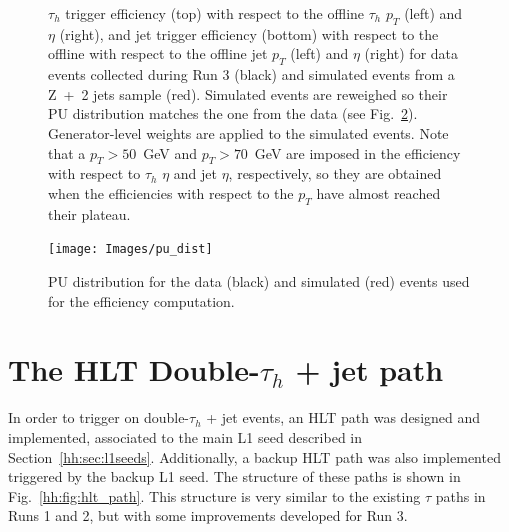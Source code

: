 \documentclass[../main.tex]{subfiles}
\begin{document}
\begin{figure}[h!]
\begin{center}
\end{center}
\caption{$\tau_h$ trigger efficiency (top) with respect to the offline $\tau_h$ $p_T$ (left) and $\eta$ (right), and jet trigger efficiency (bottom) with respect to the offline with respect to the offline jet $p_T$ (left) and $\eta$ (right) for data events collected during Run 3 (black) and simulated events from a Z~+~2 jets sample (red). Simulated events are reweighed so their PU distribution matches the one from the data (see Fig.~\ref{hh:fig:trig_pu_dist}). Generator-level weights are applied to the simulated events. Note that a $p_T>50$~GeV and $p_T>70$~GeV are imposed in the efficiency with respect to $\tau_h$ $\eta$ and jet $\eta$, respectively, so they are obtained when the efficiencies with respect to the $p_T$ have almost reached their plateau. }
\label{hh:fig:l1_eff_datamc}
\end{figure}

\begin{figure}[h!]
\begin{center}
\texttt{[image: Images/pu\_dist]}
\end{center}
\caption{PU distribution for the data (black) and simulated (red) events used for the efficiency computation.}
\label{hh:fig:trig_pu_dist}
\end{figure}



\section{The HLT Double-$\tau_h$ + jet path}
\label{hh:sec:hlt_doubletaujet}

In order to trigger on double-$\tau_h$ + jet events, an HLT path was designed and implemented, associated to the main L1 seed described in Section~\ref{hh:sec:l1seeds}. Additionally, a backup HLT path was also implemented triggered by the backup L1 seed. The structure of these paths is shown in Fig.~\ref{hh:fig:hlt_path}. This structure is very similar to the existing $\tau$ paths in Runs 1 and 2, but with some improvements developed for Run 3.
\end{document}
